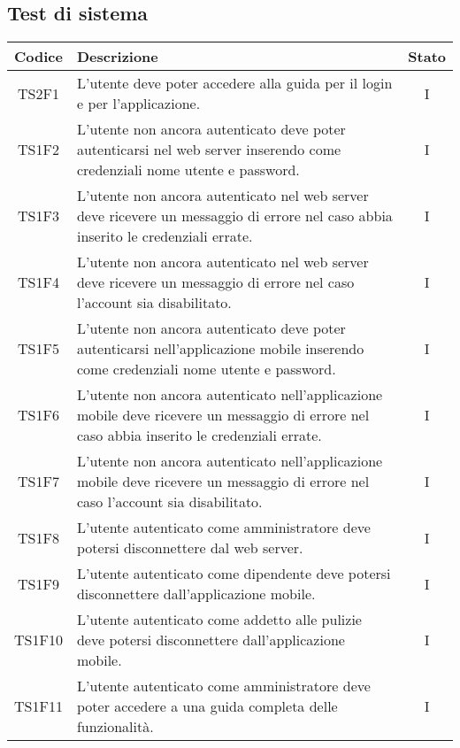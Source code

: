 	\subsection{Test di sistema}
	\begin{center}
		\begin{longtable}{|c|p{10cm}|c|}
			\hline
			\rowcolor{lighter-grayer}
			\textbf{Codice} & \textbf{Descrizione} & \textbf{Stato}  \\ 
						
			\hline
			\endhead
			
			\hline
			TS2F1 & L'utente deve poter accedere alla guida per il login e per l'applicazione. & I \\
			\hline
			TS1F2 &  L'utente non ancora autenticato deve poter autenticarsi nel web server inserendo come credenziali nome utente e password.  & I \\			
			\hline
			TS1F3 & L'utente non ancora autenticato nel web server deve ricevere un messaggio di errore nel caso abbia inserito le credenziali errate. & I \\			
			\hline
			TS1F4 & L'utente non ancora autenticato nel web server deve ricevere un messaggio di errore nel caso l'account sia disabilitato. & I \\			
			\hline
			TS1F5 & L'utente non ancora autenticato deve poter autenticarsi nell'applicazione mobile inserendo come credenziali nome utente e password. & I \\			
			\hline
			TS1F6 & L'utente non ancora autenticato nell'applicazione mobile deve ricevere un messaggio di errore nel caso abbia inserito le credenziali errate. & I \\			
			\hline
			TS1F7 & L'utente non ancora autenticato nell'applicazione mobile deve ricevere un messaggio di errore nel caso l'account sia disabilitato. & I \\			
			\hline
			TS1F8 & L'utente autenticato come amministratore deve potersi disconnettere dal web server. & I \\			
			\hline
			TS1F9 & L'utente autenticato come dipendente deve potersi disconnettere dall'applicazione mobile. & I \\			
			\hline			
			TS1F10 & L'utente autenticato come addetto alle pulizie deve potersi disconnettere dall'applicazione mobile. & I \\			
			\hline
			TS1F11 & L'utente autenticato come amministratore deve poter accedere a una guida completa delle funzionalità. & I \\		

\end{longtable}
\end{center}

